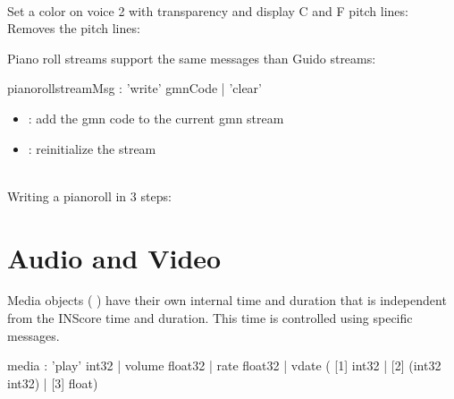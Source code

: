 \documentclass[a4paper,twoside]{report}
\newcommand{\sublevel}[1]	{\section{#1}}
\begin{document}
\example \\
Set a color on voice 2 with transparency and display C and F pitch lines: 
Removes the pitch lines: 

Piano roll streams support the same messages than Guido streams:


\begin{rail}
pianorollstreamMsg :      'write' gmnCode
				| 'clear' 
\end{rail}

\begin{itemize}
\item {}: add the gmn code to the current gmn stream
\item {}: reinitialize the stream
\end{itemize}


\example \\
Writing a pianoroll in 3 steps:

\sublevel{Audio and Video}
\label{video}

Media objects ( ) have their own internal time and duration that is independent from the INScore time and duration. 
This time is controlled using specific messages.


\begin{rail}
media :	'play' int32
		| volume float32
		| rate   float32
		| vdate  ( [1] int32 | [2] (int32 int32) | [3] float)
\end{rail}
\end{document}
